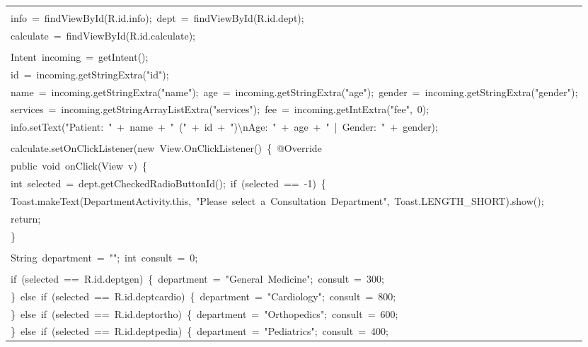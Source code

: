 \documentclass[a4paper,12pt]{article}
\begin{document}
\begin{longtable}{|p{}|}
\strut \\
{\ttfamily\small info\ =\ findViewById(R.id.info);\ dept\ =\ findViewById(R.id.dept);} \\
{\ttfamily\small calculate\ =\ findViewById(R.id.calculate);} \\
\strut \\
{\ttfamily\small Intent\ incoming\ =\ getIntent();} \\
{\ttfamily\small id\ =\ incoming.getStringExtra("id");} \\
{\ttfamily\small name\ =\ incoming.getStringExtra("name");\ age\ =\ incoming.getStringExtra("age");\ gender\ =\ incoming.getStringExtra("gender");} \\
{\ttfamily\small services\ =\ incoming.getStringArrayListExtra("services");\ fee\ =\ incoming.getIntExtra("fee",\ 0);} \\
{\ttfamily\small info.setText("Patient:\ "\ +\ name\ +\ "\ ("\ +\ id\ +\ ")\textbackslash{}nAge:\ "\ +\ age\ +\ "\ |\ Gender:\ "\ +\ gender);} \\
\strut \\
{\ttfamily\small calculate.setOnClickListener(new\ View.OnClickListener()\ \{\ @Override} \\
{\ttfamily\small public\ void\ onClick(View\ v)\ \{} \\
{\ttfamily\small int\ selected\ =\ dept.getCheckedRadioButtonId();\ if\ (selected\ ==\ -1)\ \{} \\
{\ttfamily\small Toast.makeText(DepartmentActivity.this,\ "Please\ select\ a\ Consultation\ Department",\ Toast.LENGTH\_SHORT).show();} \\
{\ttfamily\small return;} \\
{\ttfamily\small \}} \\
\strut \\
{\ttfamily\small String\ department\ =\ "";\ int\ consult\ =\ 0;} \\
\strut \\
{\ttfamily\small if\ (selected\ ==\ R.id.deptgen)\ \{\ department\ =\ "General\ Medicine";\ consult\ =\ 300;} \\
{\ttfamily\small \}\ else\ if\ (selected\ ==\ R.id.deptcardio)\ \{\ department\ =\ "Cardiology";\ consult\ =\ 800;} \\
{\ttfamily\small \}\ else\ if\ (selected\ ==\ R.id.deptortho)\ \{\ department\ =\ "Orthopedics";\ consult\ =\ 600;} \\
{\ttfamily\small \}\ else\ if\ (selected\ ==\ R.id.deptpedia)\ \{\ department\ =\ "Pediatrics";\ consult\ =\ 400;} \\

\end{longtable}
\end{document}
